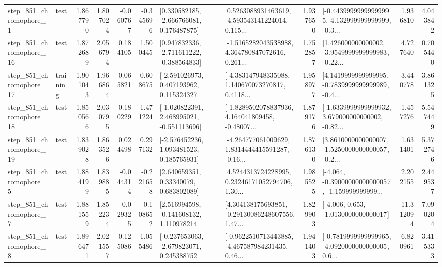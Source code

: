 \begin{tabular}{llrrrrllrlrr}
   step\_851\_chromophore\_1 &      test &      1.867790 &    1.807024 &     -0.060767 & -0.345696 &    [0.330582185, -2.666766081, 0.176487875] &  [0.5263088931463619, -4.593543141224014, 0.115... &       1.937650 &  [-0.44399999999999995, 4.132999999999999, -0.3... &            1.936810 &          4.043842 \\
  step\_851\_chromophore\_16 &      test &      1.872689 &    2.056794 &      0.184105 &  1.500445 &   [0.947832336, -2.711611222, -0.388564833] &  [-1.5165282043538988, 4.364780847072616, 0.261... &       1.752857 &  [1.426000000000002, -3.9549999999999983, -0.22... &            4.727640 &          0.705440 \\
  step\_851\_chromophore\_17 &  training &      1.901043 &    1.966864 &      0.065821 &  0.608675 &    [-2.591026973, 0.407193962, 0.115324327] &  [-4.383147948335088, 1.140670073270817, 0.4118... &       1.958977 &  [4.1419999999999995, -0.7839999999999989, -0.4... &            3.440778 &          3.861325 \\
  step\_851\_chromophore\_18 &      test &      1.850566 &    2.030795 &      0.180229 &  1.471224 &   [-1.020822391, 2.468995021, -0.551113696] &  [-1.8289502078837936, 4.164041809458, -0.48007... &       1.879176 &  [-1.6339999999999932, 3.679000000000002, -0.82... &            1.457276 &          5.547449 \\
  step\_851\_chromophore\_19 &      test &      1.839028 &    1.863526 &      0.024498 &  0.297132 &    [-2.576452236, 1.093481523, 0.185765931] &  [-4.264777061009629, 1.8314444415591287, -0.16... &       1.876130 &  [3.8610000000000007, -1.5250000000000057, -0.2... &            1.631401 &          5.372746 \\
   step\_851\_chromophore\_5 &      test &      1.884199 &    1.839885 &     -0.044314 & -0.221658 &      [2.640659351, 0.33340079, 0.683802089] &  [4.5244313724228995, 0.23246171052794706, 1.30... &       1.985525 &  [-4.064, -0.39000000000000057, -1.159999999999... &            2.202155 &          2.449537 \\
   step\_851\_chromophore\_7 &      test &      1.881559 &    1.852234 &     -0.029325 & -0.108652 &    [2.516994598, -0.141608132, 1.110978214] &  [4.304138175693851, -0.29130086248607556, 1.47... &       1.829903 &               [-4.006, 0.653, -1.0130000000000017] &           11.312094 &          7.090204 \\
   step\_851\_chromophore\_8 &      test &      1.896471 &    2.021557 &      0.125086 &  1.055486 &   [-0.237653063, -2.679823071, 0.245388752] &  [-0.9622510713443885, -4.467587984231435, 0.46... &       1.941403 &  [-0.7819999999999965, -4.0920000000000005, 0.6... &            6.820961 &          3.415333 \\

\end{tabular}
